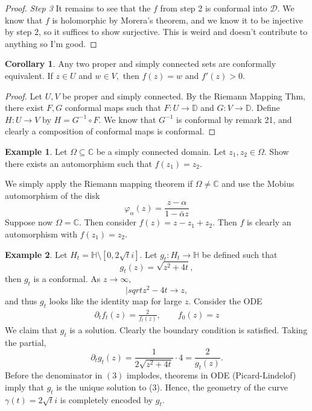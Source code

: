 \documentclass[10pt, oneside]{article}
\newcommand{\bbC}{\mathbb{C}}
\newcommand{\sm}{\setminus}
\theoremstyle{definition}
\newtheorem{exmp}{Example}[section]
\newtheorem{cor}{Corollary}
\newcommand{\bbC}{\mathbb{C}}
\newcommand{\sm}{\setminus}
\begin{document}
\begin{proof}
\textit{Step 3} It remains to see that the $f$ from step 2 is conformal into $\mathcal{D}.$ We know that $f$ is holomorphic by Morera's theorem, and we know it to be injective by step 2, so it suffices to show surjective. This is weird and  doesn't contribute to anything so I'm good.
    
\end{proof}

\begin{cor}
    Any two proper and simply connected sets are conformally equivalent. If $z \in U$ and $w \in V,$ then $f(z) = w$ and $f'(z) >0.$ 
\end{cor}
\begin{proof}
    Let $U,V$ be proper and simply connected. By the Riemann Mapping Thm, there exist $F,G$ conformal maps such that $F: U \to \mathbb{D}$ and $G: V\to \mathbb{D}.$ Define $H: U\to V$ by $H = G^{-1}\circ F.$ We know that $G^{-1}$ is conformal by remark 21, and clearly a composition of conformal maps is conformal. 
\end{proof}

\begin{exmp}
    Let $\Omega \subseteq \bbC$ be a simply connected domain. Let $z_1, z_2 \in \Omega.$ Show there exists an automorphism such that $f(z_1) = z_2.$ 

    We simply apply the Riemann mapping theorem if $\Omega \neq \bbC$ and use the Mobius automorphism of the disk
    \[\varphi_\alpha(z) = \frac{z-\alpha}{1-\bar\alpha z}\]
    Suppose now $\Omega = \bbC.$ Then consider $f(z) = z - z_1 + z_2.$ Then $f$ is clearly an automorphism with $f(z_1) = z_2.$
\end{exmp}

\begin{exmp}
    Let $H_t = \mathbb{H}\sm [0, 2\sqrt{t}i].$ Let $g_t : H_t \to \mathbb{H}$ be defined such that 
    \[g_t(z) = \sqrt{z^2 + 4t},\] then $g_t$ is a conformal. As $z\to \infty,$ 
    \[|sqrt{z^2 - 4t}\to z,\] and thus $g_t$ looks like the identity map for large $z.$ Consider the ODE 
    \begin{align}
\partial_t f_t (z) = \frac{2}{f_t(z)}, \qquad f_0(z)= z        
    \end{align}
 We claim that $g_t$ is a solution. Clearly the boundary condition is satisfied. Taking the partial, 
    \[\partial_t g_t(z) = \frac{1}{2\sqrt{z^2 + 4t}}\cdot 4 = \frac{2}{g_t(z)}.\] Before the denominator in $(3)$ implodes, theorems in ODE (Picard-Lindelof) imply that $g_t$ is the unique solution to (3). Hence, the geometry of the curve $\gamma(t) = 2\sqrt{t}i$ is completely encoded by $g_t.$
\end{exmp}
\end{document}
